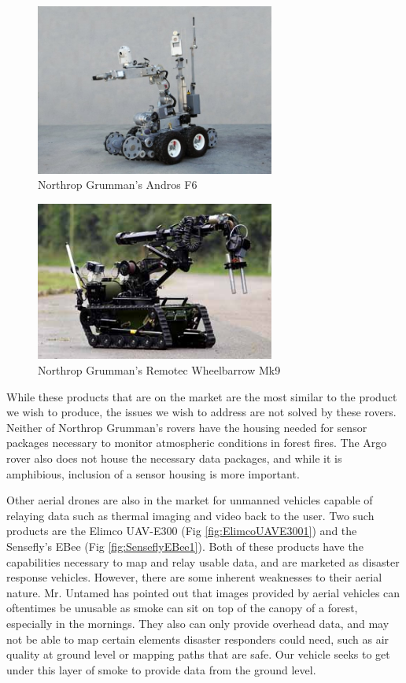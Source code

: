 \begin{figure}[H]
\centering
\includegraphics[width=0.7\textwidth]{NG1.jpg}
\caption{Northrop Grumman's Andros F6}
\label{fig:NorthropAndros1}
\end{figure}

\begin{figure}[H]
\centering
\includegraphics[width=0.7\textwidth]{wheelbarrow.jpg}
\caption{Northrop Grumman's Remotec Wheelbarrow Mk9}
\label{fig:NorthropWheelbarrow1}
\end{figure}

While these products that are on the market are the most similar to the product we wish to produce, the issues we wish to address are not solved by these rovers. Neither of Northrop Grumman's rovers have the housing needed for sensor packages necessary to monitor atmospheric conditions in forest fires. The Argo rover also does not house the necessary data packages, and while it is amphibious, inclusion of a sensor housing is more important.

Other aerial drones are also in the market for unmanned vehicles capable of relaying data such as thermal imaging and video back to the user. Two such products are the Elimco UAV-E300 (Fig \ref{fig:ElimcoUAVE3001}) and the Sensefly's EBee (Fig \ref{fig:SenseflyEBee1}). Both of these products have the capabilities necessary to map and relay usable data, and are marketed as disaster response vehicles. However, there are some inherent weaknesses to their aerial nature. Mr. Untamed has pointed out that images provided by aerial vehicles can oftentimes be unusable as smoke can sit on top of the canopy of a forest, especially in the mornings. They also can only provide overhead data, and may not be able to map certain elements disaster responders could need, such as air quality at ground level or mapping paths that are safe. Our vehicle seeks to get under this layer of smoke to provide data from the ground level.

